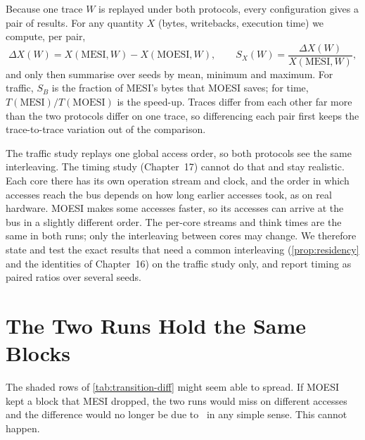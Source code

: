 Because one trace $W$ is replayed under both protocols, every configuration gives a
pair of results. For any quantity $X$ (bytes, writebacks, execution time) we
compute, per pair,
\begin{equation}
  \Delta X(W) = X(\mathrm{MESI},W) - X(\mathrm{MOESI},W),
  \qquad
  S_X(W) = \frac{\Delta X(W)}{X(\mathrm{MESI},W)},
  \label{eq:paired}
\end{equation}
and only then summarise over seeds by mean, minimum and maximum. For traffic,
$S_B$ is the fraction of MESI's bytes that MOESI saves; for time,
$T(\mathrm{MESI})/T(\mathrm{MOESI})$ is the speed-up. Traces differ from each other
far more than the two protocols differ on one trace, so differencing each pair
first keeps the trace-to-trace variation out of the comparison.

\label{sec:method-timing}
The traffic study replays one global access order, so both protocols see the same
interleaving. The timing study (Chapter~17) cannot do that and stay realistic. Each
core there has its own operation stream and clock, and the order in which accesses
reach the bus depends on how long earlier accesses took, as on real hardware.
MOESI makes some accesses faster, so its accesses can arrive at the bus in a
slightly different order. The per-core streams and think times are the same in both
runs; only the interleaving between cores may change. We therefore state and test
the exact results that need a common interleaving (\cref{prop:residency} and the
identities of Chapter~16) on the traffic study only, and report timing as paired
ratios over several seeds.

\section{The Two Runs Hold the Same Blocks}
\label{sec:method-residency}
\label{sec:method-example}
%

The shaded rows of \cref{tab:transition-diff} might seem able to spread. If MOESI
kept a block that MESI dropped, the two runs would miss on different accesses and
the difference would no longer be due to \stO\ in any simple sense. This cannot
happen.

